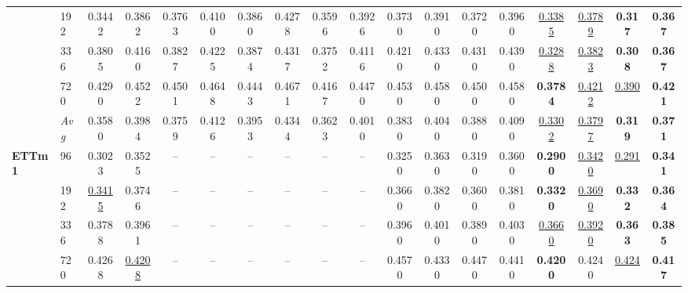 \begin{tabular}{llcccccccccccccccc}
               & 192        &         0.3442 &         0.3862 &         0.3763 &         0.4100 &         0.3860 &         0.4278 &         0.3596 &         0.3926 &         0.3730 &         0.3910 &         0.3720 &         0.3960 & \underline{0.3385} & \underline{0.3789} & \textbf{0.317} & \textbf{0.367} \\
               & 336        &         0.3805 &         0.4160 &         0.3827 &         0.4225 &         0.3874 &         0.4317 &         0.3752 &         0.4116 &         0.4210 &         0.4330 &         0.4310 &         0.4390 & \underline{0.3288} & \underline{0.3823} & \textbf{0.308} & \textbf{0.367} \\
               & 720        &         0.4290 &         0.4522 &         0.4501 &         0.4648 &         0.4443 &         0.4671 &         0.4167 &         0.4470 &         0.4530 &         0.4580 &         0.4500 &         0.4580 & \textbf{0.3784} & \underline{0.4212} & \underline{0.390} & \textbf{0.421} \\
               & \textit{Avg} &         0.3580 &         0.3984 &         0.3759 &         0.4126 &         0.3953 &         0.4344 &         0.3623 &         0.4010 &         0.3830 &         0.4040 &         0.3880 &         0.4090 & \underline{0.3302} & \underline{0.3797} & \textbf{0.319} & \textbf{0.371} \\
\midrule
\textbf{ETTm1} & 96         &         0.3023 &         0.3525 &             -- &             -- &             -- &             -- &             -- &             -- &         0.3250 &         0.3630 &         0.3190 &         0.3600 & \textbf{0.2900} & \underline{0.3420} & \underline{0.291} & \textbf{0.341} \\
               & 192        & \underline{0.3415} &         0.3746 &             -- &             -- &             -- &             -- &             -- &             -- &         0.3660 &         0.3820 &         0.3600 &         0.3810 & \textbf{0.3320} & \underline{0.3690} & \textbf{0.332} & \textbf{0.364} \\
               & 336        &         0.3788 &         0.3961 &             -- &             -- &             -- &             -- &             -- &             -- &         0.3960 &         0.4010 &         0.3890 &         0.4030 & \underline{0.3660} & \underline{0.3920} & \textbf{0.363} & \textbf{0.385} \\
               & 720        &         0.4268 & \underline{0.4208} &             -- &             -- &             -- &             -- &             -- &             -- &         0.4570 &         0.4330 &         0.4470 &         0.4410 & \textbf{0.4200} &         0.4240 & \underline{0.424} & \textbf{0.417} \\

\end{tabular}
